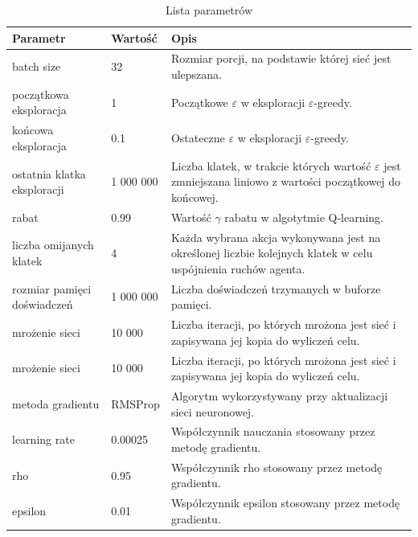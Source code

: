 \documentclass[12pt]{article}
\begin{document}
\begin{center}

\begin{table}[H]
  \centering%
  \caption{Lista parametrów}
\begin{tabular}{|p{3cm}|p{3cm}|p{10cm}|}
\hline
\textbf{Parametr} & \textbf{Wartość} & \textbf{Opis} \\
\hline

batch size &
32 & 
Rozmiar porcji, na podstawie której sieć jest ulepszana. \\
\hline

początkowa eksploracja &
1 &
Początkowe $\varepsilon$ w eksploracji $\varepsilon$-greedy. \\
\hline

końcowa eksploracja &
0.1 &
Ostateczne $\varepsilon$ w eksploracji $\varepsilon$-greedy. \\
\hline

ostatnia klatka eksploracji &
1 000 000 &
Liczba klatek, w trakcie których wartość $\varepsilon$ jest zmniejszana liniowo z wartości początkowej do końcowej.\\
\hline

rabat &
0.99 &
Wartość $\gamma$ rabatu w algotytmie Q-learning.\\
\hline

liczba omijanych klatek &
4 &
Każda wybrana akcja wykonywana jest na określonej liczbie kolejnych klatek w celu uspójnienia ruchów agenta. \\
\hline

rozmiar pamięci doświadczeń &
1 000 000 &
Liczba doświadczeń trzymanych w buforze pamięci.
\\
\hline

mrożenie sieci &
10 000 &
Liczba iteracji, po których mrożona jest sieć i zapisywana jej kopia do wyliczeń celu.  \\
\hline

mrożenie sieci &
10 000 &
Liczba iteracji, po których mrożona jest sieć i zapisywana jej kopia do wyliczeń celu.  \\
\hline


metoda gradientu &
RMSProp &
Algorytm wykorzystywany przy aktualizacji sieci neuronowej.  \\
\hline

learning rate &
0.00025 &
Współczynnik nauczania stosowany przez metodę gradientu.  \\
\hline

rho &
0.95 &
Współczynnik rho stosowany przez metodę gradientu.  \\
\hline

epsilon &
0.01&
Współczynnik epsilon stosowany przez metodę gradientu.  \\
\hline

\end{tabular}
\end{table}
\end{center}
\end{document}
